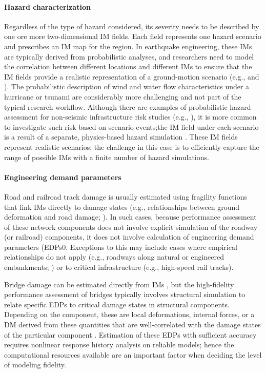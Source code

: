 \paragraph{Hazard characterization} Regardless of the type of hazard considered, its severity needs to be described by one ore more two-dimensional IM fields. Each field represents one hazard scenario and prescribes an IM map for the region. In earthquake engineering, these IMs are typically derived from probabilistic analyses, and researchers need to model the correlation between different locations and different IMs to ensure that the IM fields provide a realistic representation of a ground-motion scenario (e.g., \cite{lee2006uncertainty, han2012probabilistic} and \cite{loth2013spatial}). The probabilistic description of wind and water flow characteristics under a hurricane or tsunami are considerably more challenging and not part of the typical research workflow. Although there are examples of probabilistic hazard assessment for non-seismic infrastructure risk studies (e.g., \cite{kameshwar2014multi}), it is more common to investigate such risk based on scenario events;the IM field under each scenario is a result of a separate, physics-based hazard simulation \citep{bjarnadottir2014regional}. These IM fields represent realistic scenarios; the challenge in this case is to efficiently capture the range of possible IMs with a finite number of hazard simulations. 

\paragraph{Engineering demand parameters} Road and railroad track damage is usually estimated using fragility functions that link IMs directly to damage states (e.g., relationships between ground deformation and road damage; \cite{argyroudis2014fragility}). In such cases, because performance assessment of these network components does not involve explicit simulation of the roadway (or railroad) components, it does not involve calculation of engineering demand parameters (EDPs0. Exceptions to this may include cases where empirical relationships do not apply (e.g., roadways along natural or engineered embankments; \cite{lagaros2009computationally, yin2017embankment}) or to critical infrastructure (e.g., high-speed rail tracks).

Bridge damage can be estimated directly from IMs \citep[e.g.,][]{fema2018earthquaketechnical}, but the high-fidelity performance assessment of bridges typically involves structural simulation to relate specific EDPs to critical damage states in structural components. Depending on the component, these are local deformations, internal forces, or a DM derived from these quantities \citep[e.g.,][]{park1985mechanistic} that are well-correlated with the damage states of the particular component \citep{choi2004seismic}. Estimation of these EDPs with sufficient accuracy requires nonlinear response history analysis on reliable models; hence the computational resources available are an important factor when deciding the level of modeling fidelity.

